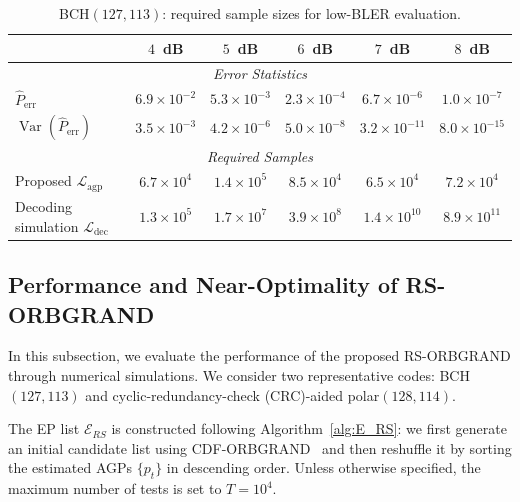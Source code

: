 \documentclass[letterpaper,draftclsnofoot,onecolumn]{IEEEtran}
\begin{document}
\begin{table}[ht]
    \renewcommand{\arraystretch}{1.2}
    \caption{BCH$(127,113)$: required sample sizes for low-BLER evaluation.}
    \label{Tab:simu_num_BCH}
    \centering
    \setlength{\tabcolsep}{5pt}
    \begin{tabular}{lccccc}
    \toprule
    & \textbf{$4$~dB} & \textbf{$5$~dB} & \textbf{$6$~dB} & \textbf{$7$~dB} & \textbf{$8$~dB} \\
    \midrule
    \multicolumn{6}{c}{\textit{Error Statistics}} \\
    \midrule
    $\hat{P}_{\text{err}}$  & $6.9\!\times\!10^{-2}$ & $5.3\!\times\!10^{-3}$ & $2.3\!\times\!10^{-4}$ & $6.7\!\times\!10^{-6}$ & $1.0\!\times\!10^{-7}$ \\
    $\operatorname{Var}(\hat{P}_{\text{err}})$   & $3.5\!\times\!10^{-3}$ & $4.2\!\times\!10^{-6}$ & $5.0\!\times\!10^{-8}$ & $3.2\!\times\!10^{-11}$ & $8.0\!\times\!10^{-15}$ \\
    \midrule
    \multicolumn{6}{c}{\textit{Required Samples}} \\
    \midrule
    Proposed $\mathcal{L}_{\text{agp}}$  & $6.7\!\times\!10^{4}$ & $1.4\!\times\!10^{5}$ & $8.5\!\times\!10^{4}$ & $6.5\!\times\!10^{4}$ & $7.2\!\times\!10^{4}$ \\
    Decoding simulation $\mathcal{L}_{\text{dec}}$        & $1.3\!\times\!10^{5}$ & $1.7\!\times\!10^{7}$ & $3.9\!\times\!10^{8}$ & $1.4\!\times\!10^{10}$ & $8.9\!\times\!10^{11}$ \\
    \bottomrule
    \end{tabular}
\end{table}


\subsection{Performance and Near-Optimality of RS-ORBGRAND}\label{SubSec:RSORB}

In this subsection, we evaluate the performance of the proposed RS-ORBGRAND through numerical simulations. We consider two representative codes: BCH$(127,113)$ and cyclic-redundancy-check (CRC)-aided polar$(128,114)$.

The EP list $\mathcal{E}_{RS}$ is constructed following Algorithm~\ref{alg:E_RS}: we first generate an initial candidate list using CDF-ORBGRAND~\cite{duffy2022ORBGRAND, liu2022orbgrand} and then reshuffle it by sorting the estimated AGPs $\{p_t\}$ in descending order. Unless otherwise specified, the maximum number of tests is set to $T=10^4$.
\end{document}

